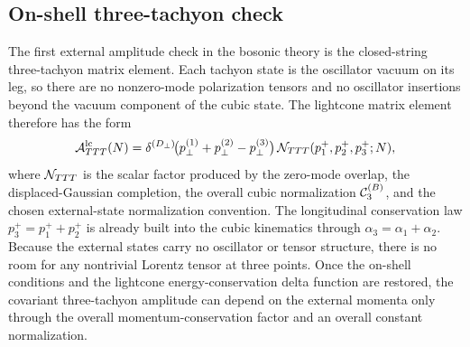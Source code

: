 \documentclass[11pt]{article}
\numberwithin{equation}{section}
\newcommand{\perpD}{D_\perp}
\begin{document}
\subsection{On-shell three-tachyon check}
The first external amplitude check in the bosonic theory is the closed-string three-tachyon matrix element. Each tachyon state is the oscillator vacuum on its leg, so there are no nonzero-mode polarization tensors and no oscillator insertions beyond the vacuum component of the cubic state. The lightcone matrix element therefore has the form
\begin{equation}
\label{eq:s12-1-001}
{\cal A}_{TTT}^{\mathrm{lc}}(N)
=
\delta^{(\perpD)}\!\bigl(p_\perp^{(1)}+p_\perp^{(2)}-p_\perp^{(3)}\bigr)\,
{\cal N}_{TTT}(p_1^+,p_2^+,p_3^+;N),
\end{equation}
where ${\cal N}_{TTT}$ is the scalar factor produced by the zero-mode overlap, the displaced-Gaussian completion, the overall cubic normalization ${\cal C}_3^{(B)}$, and the chosen external-state normalization convention. The longitudinal conservation law $p_3^+=p_1^++p_2^+$ is already built into the cubic kinematics through $\alpha_3=\alpha_1+\alpha_2$. Because the external states carry no oscillator or tensor structure, there is no room for any nontrivial Lorentz tensor at three points. Once the on-shell conditions and the lightcone energy-conservation delta function are restored, the covariant three-tachyon amplitude can depend on the external momenta only through the overall momentum-conservation factor and an overall constant normalization.
\end{document}
